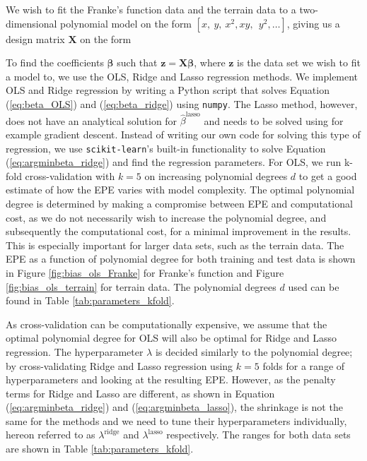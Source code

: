 \documentclass[a4paper, 10pt]{article}
\begin{document}
\begin{multicols}{2}
We wish to fit the Franke's function data and the terrain data to a two-dimensional polynomial model on the form $[x,\ y,\ x^2, xy,\ \ y^2, \dots]$,  giving us a design matrix $\bm{X}$ on the form \\

\setlength{\arraycolsep}{1.5pt}
\noindent
{}
\vspace{1pt}

\noindent
To find the coefficients $\bm{\beta}$ such that $\bm{ z} = \bm{X \beta} $, where $\bm{z}$ is the data set we wish to fit a model to, we use the OLS, Ridge and Lasso regression methods. 
We implement OLS and Ridge regression by writing a Python script that solves Equation (\ref{eq:beta_OLS}) and (\ref{eq:beta_ridge}) using \texttt{numpy}. The Lasso method, however, does not have an analytical solution for $\hat{\beta}^\text{lasso}$ and needs to be solved using for example gradient descent. Instead of writing our own code for solving this type of regression, we use \texttt{scikit-learn}'s built-in functionality to solve Equation (\ref{eq:argminbeta_ridge}) and find the regression parameters.
\noindent
For OLS, we run k-fold cross-validation with $k=5$ on increasing polynomial degrees $d$ to get a good estimate of how the EPE varies with model complexity. The optimal polynomial degree is determined by making a compromise between EPE and computational cost, as we do not necessarily wish to increase the polynomial degree, and subsequently the computational cost, for a minimal improvement in the results. This is especially important for larger data sets, such as the terrain data. The EPE as a function of polynomial degree for both training and test data is shown in Figure \ref{fig:bias_ols_Franke} for Franke's function and Figure \ref{fig:bias_ols_terrain} for terrain data. The polynomial degrees $d$ used can be found in Table \ref{tab:parameters_kfold}.

As cross-validation can be computationally expensive, we assume that the optimal polynomial degree for OLS will also be optimal for Ridge and Lasso regression. The hyperparameter $\lambda$ is decided similarly to the polynomial degree; by cross-validating  Ridge and Lasso regression using $k=5$ folds for a range of hyperparameters and looking at the resulting EPE. However, as the penalty terms for Ridge and Lasso are different, as shown in Equation (\ref{eq:argminbeta_ridge}) and (\ref{eq:argminbeta_lasso}), the shrinkage is not the same for the methods and we need to tune their hyperparameters individually, hereon referred to as $\lambda^\text{ridge}$ and $\lambda^\text{lasso}$ respectively. The ranges for both data sets  are shown in Table \ref{tab:parameters_kfold}.  


\end{multicols}
\end{document}
